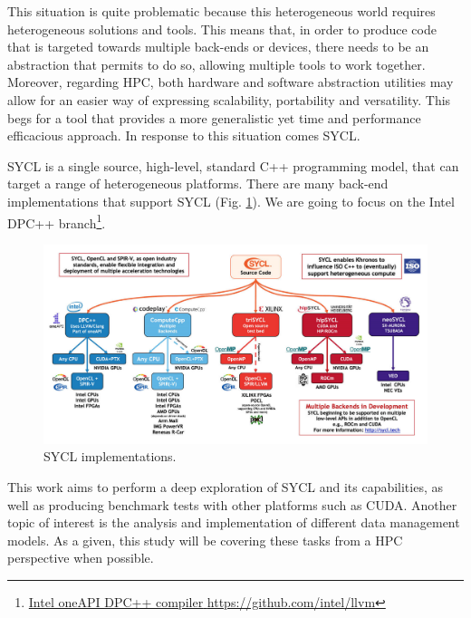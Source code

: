 This situation is quite problematic because this heterogeneous world requires heterogeneous solutions and tools.
This means that, in order to produce code that is targeted towards multiple back-ends or devices, there needs to be an abstraction that permits to do so, allowing multiple tools to work together.
Moreover, regarding HPC, both hardware and software abstraction utilities may allow for an easier way of expressing scalability, portability and versatility.
This begs for a tool that provides a more generalistic yet time and performance efficacious approach. In response to this situation comes SYCL.


SYCL is a single source, high-level, standard C++ programming model, that can target a range of heterogeneous platforms.
There are many back-end implementations that support SYCL (Fig. \ref{fig:sycl-implementations}).
We are going to focus on the Intel DPC++ branch\footnote{\href{https://github.com/intel/llvm}{{Intel oneAPI DPC++ compiler} \url{https://github.com/intel/llvm}}}.

\begin{figure}[H]
	\centering
	\includegraphics[width=\linewidth]{images/sycl-implementations.png}
	\caption{SYCL implementations.}
	\label{fig:sycl-implementations}
\end{figure}

This work aims to perform a deep exploration of SYCL and its capabilities, as well as producing benchmark tests with other platforms such as CUDA.
Another topic of interest is the analysis and implementation of different data management models.
As a given, this study will be covering these tasks from a HPC perspective when possible.

